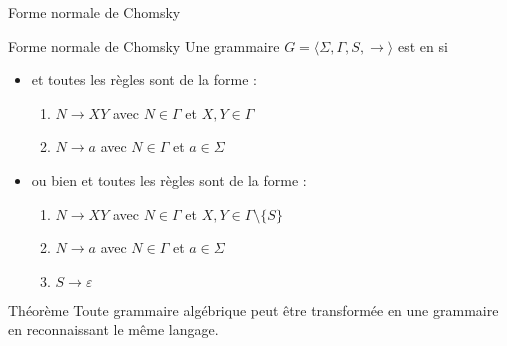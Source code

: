 
\begingroup

\begin{frame}{Forme normale de Chomsky}
  
  \begin{block}{Forme normale de Chomsky}
    Une grammaire $G = \langle \Sigma, \Gamma, S, \rightarrow \rangle$ est en  si
    \begin{itemize}
    \item\vspace{2mm}  et toutes les règles sont de la forme :
      \begin{enumerate}
      \item\vspace{1mm} $N \rightarrow XY$ \hspace{5mm} avec $N\in \Gamma$ et $X, Y \in \Gamma$
      \item $N \rightarrow a$  \hspace{7.5mm} avec $N \in \Gamma$ et $a\in \Sigma$
      \end{enumerate}
    \item\vspace{2mm} ou bien  et toutes les règles sont de la forme :
      \begin{enumerate}
      \item\vspace{1mm} $N \rightarrow XY$ \hspace{5mm} avec $N\in \Gamma$ et $X, Y \in \Gamma \setminus \{S\}$
      \item $N \rightarrow a$  \hspace{7.5mm} avec $N \in \Gamma$ et $a\in \Sigma$
      \item $S \rightarrow \varepsilon$
      \end{enumerate}
    \end{itemize}
  \end{block}

  \begin{block}{Théorème}
    Toute grammaire algébrique peut être transformée en une
    grammaire en  reconnaissant le même langage. 
  \end{block}

\end{frame}

\endgroup
